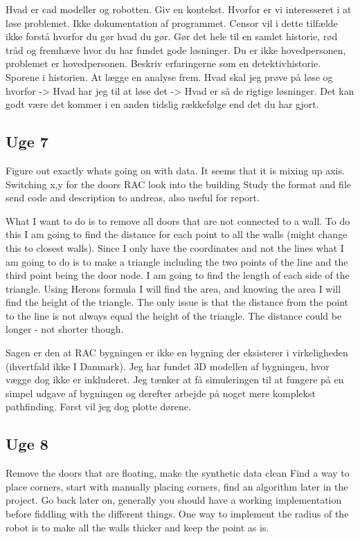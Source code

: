 Hvad er cad modeller og robotten.
Giv en kontekst.
Hvorfor er vi interesseret i at løse problemet.
Ikke dokumentation af programmet. Censor vil i dette tilfælde ikke forstå hvorfor du gør hvad du gør.
Gør det hele til en samlet historie, rød tråd og fremhæve hvor du har fundet gode løsninger.
Du er ikke hovedpersonen, problemet er hovedpersonen. 
Beskriv erfaringerne som en detektivhistorie. 
Sporene i historien.
At lægge en analyse frem.
Hvad skal jeg prøve på løse og hvorfor -> Hvad har jeg til at løse det -> Hvad er så de rigtige løsninger.
Det kan godt være det kommer i en anden tidslig rækkefølge end det du har gjort. 



\subsection{Uge 7}
Figure out exactly whats going on with data.
It seems that it is mixing up axis.
Switching x,y for the doors
RAC look into the building 
Study the format and file
send code and description to andreas, also useful for report.

What I want to do is to remove all doors that are not connected to a wall. To do this I am going to find the distance for each point to all the walls (might change this to closest walls). Since I only have the coordinates and not the lines what I am going to do is to make a triangle including the two points of the line and the third point being the door node. I am going to find the length of each side of the triangle. Using Herons formula I will find the area, and knowing the area I will find the height of the triangle. The only issue is that the distance from the point to the line is not always equal the height of the triangle. The distance could be longer - not shorter though.

Sagen er den at RAC bygningen er ikke en bygning der eksisterer i virkeligheden (ihvertfald ikke I Danmark). Jeg har fundet 3D modellen af bygningen, hvor vægge dog ikke er inkluderet. Jeg tænker at få simuleringen til at fungere på en simpel udgave af bygningen og derefter arbejde på noget mere komplekst pathfinding. Først vil jeg dog plotte dørene.

\subsection{Uge 8}
Remove the doors that are floating, make the synthetic data clean
Find a way to place corners, start with manually placing corners, find an algorithm later in the project.
Go back later on, generally you should have a working implementation before fiddling with the  different things.
One way to implement the radius of the robot is to make all the walls thicker and keep the point as is.

